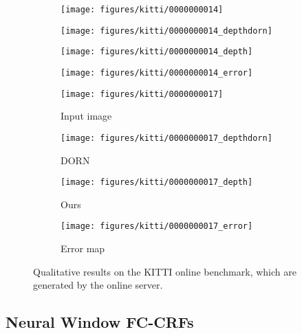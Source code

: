 \documentclass[10pt,twocolumn,letterpaper]{article}
\begin{document}
\begin{figure*}[t]
\begin{subfigure}{0.49\columnwidth}
  \centering
  \texttt{[image: figures/kitti/0000000014]}
\end{subfigure}
\begin{subfigure}{0.49\columnwidth}
  \centering
  \texttt{[image: figures/kitti/0000000014\_depthdorn]}
\end{subfigure}
\begin{subfigure}{0.49\columnwidth}
  \centering
  \texttt{[image: figures/kitti/0000000014\_depth]}
\end{subfigure}
\begin{subfigure}{0.49\columnwidth}
  \centering
  \texttt{[image: figures/kitti/0000000014\_error]}
\end{subfigure}

\begin{subfigure}{0.49\columnwidth}
  \centering
  \texttt{[image: figures/kitti/0000000017]}
  \caption*{Input image}
\end{subfigure}
\begin{subfigure}{0.49\columnwidth}
  \centering
  \texttt{[image: figures/kitti/0000000017\_depthdorn]}
  \caption*{DORN}
\end{subfigure}
\begin{subfigure}{0.49\columnwidth}
  \centering
  \texttt{[image: figures/kitti/0000000017\_depth]}
  \caption*{Ours}
\end{subfigure}
\begin{subfigure}{0.49\columnwidth}
  \centering
  \texttt{[image: figures/kitti/0000000017\_error]}
  \caption*{Error map}
\end{subfigure}

\vspace{-2mm}
\caption{Qualitative results on the KITTI online benchmark, which are generated by the online server.}
\label{fig:res-kitti}
\vspace{-2mm}
\end{figure*}








\subsection{Neural Window FC-CRFs}
\end{document}
